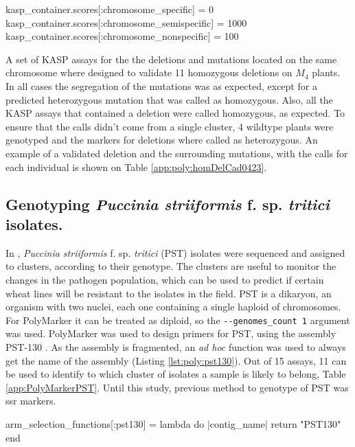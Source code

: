 \begin{code}[language=Ruby,caption=Score values to select semi-specifc primers, label=lst:poly:delsScore]
kasp_container.scores[:chromosome_specific] = 0
kasp_container.scores[:chromosome_semispecific] = 1000
kasp_container.scores[:chromosome_nonspecific] = 100    
\end{code}

A set of KASP assays for the the deletions and mutations located on the same chromosome where designed to validate 11 homozygous deletions on $M_{4}$ plants. 
In all cases the segregation of the mutations was as expected, except for a predicted heterozygous mutation that was called as homozygous. 
Also, all the KASP assays that contained a deletion were called homozygous, as expected. 
To ensure that the calls didn't come from a single cluster, 4 wildtype plants were genotyped and the markers for deletions where called as heterozygous. 
An example of a validated deletion and the surrounding mutations, with the calls for each individual is shown on Table \ref{app:poly:homDelCad0423}. 
  



\subsection{Genotyping \textit{Puccinia 
striiformis} f. sp. \textit{tritici} isolates.}
In \cite{Hubbard2015}, \textit{Puccinia striiformis} f. sp. \textit{tritici} (PST) isolates were sequenced and assigned to clusters, according to their genotype.
The clusters are useful to monitor the changes in the pathogen population, which can be used to predict if certain wheat lines will be resistant to the isolates in the field. 
PST is a dikaryon, an organism with two nuclei, each one containing a single haploid of chromosomes.
For PolyMarker it can be treated as diploid, so the \verb|--genomes_count 1| argument was used.
PolyMarker was used to design primers for PST, using the assembly PST-130 \citet{Cantu2011}.
As the assembly is fragmented, an \textit{ad hoc} function was used to always get the name of the assembly (Listing \ref{lst:poly:pst130}). 
Out of 15 assays, 11 can be used to identify to which cluster of isolates a sample is likely to belong, Table \ref{app:PolyMarkerPST}.
Until this study, previous method to genotype of PST was \acrshort{ssr} markers.

\begin{code}[language=Ruby,caption=Function that always returns PST130 as chromosome, label=lst:poly:pst130]
arm_selection_functions[:pst130] = lambda do |contig_name|       
  return "PST130"
end
\end{code}

